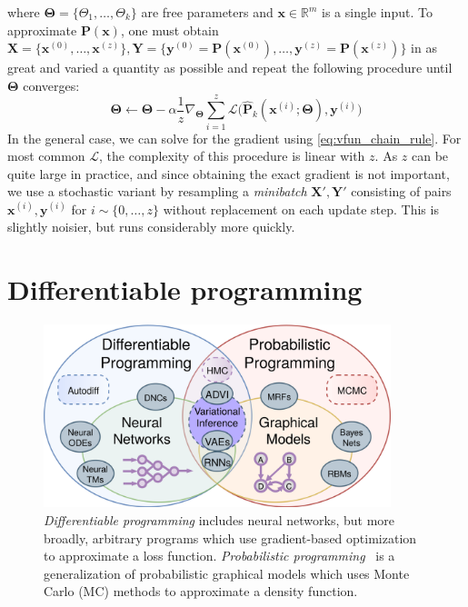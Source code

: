 %
where $\bm\Theta = \{\Theta_1, \dots, \Theta_k\}$ are free parameters and $\mathbf{x} \in \mathbb{R}^m$ is a single input. To approximate $\mathbf{P}(\mathbf x)$, one must obtain $\mathbf{X} = \{\mathbf{x}^{(0)}, \dots, \mathbf{x}^{(z)}\}, \mathbf{Y} = \{\mathbf{y}^{(0)} = \mathbf{P}(\mathbf{x}^{(0)}), \dots, \mathbf{y}^{(z)} = \mathbf{P}(\mathbf{x}^{(z)})\}$ in as great and varied a quantity as possible and repeat the following procedure until $\bm\Theta$ converges:
%
\begin{equation} \label{eq:stochastic_grad_descent}
\bm\Theta \leftarrow \bm\Theta - \alpha\frac{1}{z}\nabla_{\bm\Theta} \sum_{i=1}^z\mathcal{L}\big(\mathbf{\hat P}_k(\mathbf{x}^{(i)}; \bm\Theta), \mathbf{y}^{(i)}\big)
\end{equation}
%
In the general case, we can solve for the gradient using \autoref{eq:vfun_chain_rule}. For most common $\mathcal{L}$, the complexity of this procedure is linear with $z$. As $z$ can be quite large in practice, and since obtaining the exact gradient is not important, we use a stochastic variant by resampling a \textit{minibatch} $\mathbf{X}', \mathbf{Y}'$ consisting of pairs $\mathbf{x}^{(i)}, \mathbf{y}^{(i)}$ for $i \sim \{0, \dots, z\}$ without replacement on each update step. This is slightly noisier, but runs considerably more quickly.

\section{Differentiable programming}\label{sec:differentiable-programming}

\begin{figure}
    \centering
    \includegraphics[width=0.90\textwidth]{../figures/diff_prob_prog.png}
    \caption{\textit{Differentiable programming} includes neural networks, but more broadly, arbitrary programs which use gradient-based optimization to approximate a loss function. \textit{Probabilistic programming}~\citep{tristan2014augur, carpenter2017stan, gorinova2018slicstan} is a generalization of probabilistic graphical models which uses Monte Carlo (MC) methods to approximate a density function.}
    \label{fig:diff_prob_prog}
\end{figure}

